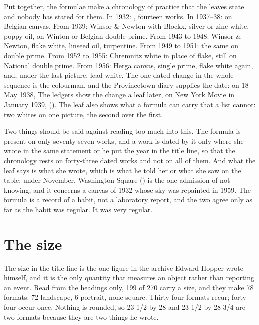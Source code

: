 Put together, the formulae make a chronology of practice that the leaves state and nobody has stated for them. In 1932: , fourteen works. In 1937--38:  on Belgian canvas. From 1939: Winsor \& Newton with Blockx, silver or zinc white, poppy oil, on Winton or Belgian double prime. From 1943 to 1948: Winsor \& Newton, flake white, linseed oil, turpentine. From 1949 to 1951: the same on  double prime. From 1952 to 1955: Chremnitz white in place of flake, still on National double prime. From 1956: Herga canvas, single prime, flake white again, and, under the last picture, lead white. The one dated change in the whole sequence is the colourman, and the Provincetown diary supplies the date: on 18 May 1938,  The ledgers show the change a leaf later, on New York Movie in January 1939,  (). The leaf also shows what a formula can carry that a list cannot: two whites on one picture, the second over the first.

Two things should be said against reading too much into this. The formula is present on only seventy-seven works, and a work is dated by it only where she wrote  in the same statement or he put the year in the title line, so that the chronology rests on forty-three dated works and not on all of them. And what the leaf says is what she wrote, which is what he told her or what she saw on the table;  under November, Washington Square () is the one admission of not knowing, and it concerns a canvas of 1932 whose sky was repainted in 1959. The formula is a record of a habit, not a laboratory report, and the two agree only as far as the habit was regular. It was very regular.



\section{The size}

The size in the title line is the one figure in the archive Edward Hopper wrote himself, and it is the only quantity that measures an object rather than reporting an event. Read from the headings only, 199 of 270 carry a size, and they make 78 formats: 72 landscape, 6 portrait, none square. Thirty-four formats recur; forty-four occur once. Nothing is rounded, so 23 1/2 by 28 and 23 1/2 by 28 3/4 are two formats because they are two things he wrote.

